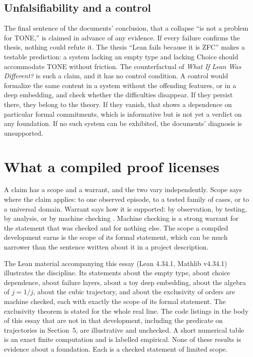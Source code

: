 \documentclass[11pt]{article}
\begin{document}
\subsection{Unfalsifiability and a control}

The final sentence of the documents' conclusion, that a collapse ``is not a problem for TONE,'' is claimed in advance of any evidence. If every failure confirms the thesis, nothing could refute it. The thesis ``Lean fails because it is ZFC'' makes a testable prediction: a system lacking an empty type and lacking Choice should accommodate TONE without friction. The counterfactual of \emph{What If Lean Was Different?} is such a claim, and it has no control condition. A control would formalize the same content in a system without the offending features, or in a deep embedding, and check whether the difficulties disappear. If they persist there, they belong to the theory. If they vanish, that shows a dependence on particular formal commitments, which is informative but is not yet a verdict on any foundation. If no such system can be exhibited, the documents' diagnosis is unsupported.

\section{What a compiled proof licenses}
\label{sec:licenses}

A claim has a scope and a warrant, and the two vary independently. Scope says where the claim applies: to one observed episode, to a tested family of cases, or to a universal domain. Warrant says how it is supported: by observation, by testing, by analysis, or by machine checking \cite{flyxion2026adv,flyxion2026deg}. Machine checking is a strong warrant for the statement that was checked and for nothing else. The scope a compiled development earns is the scope of its formal statement, which can be much narrower than the sentence written about it in a project description.

The Lean material accompanying this essay (Lean 4.34.1, Mathlib v4.34.1) illustrates the discipline. Its statements about the empty type, about choice dependence, about failure layers, about a toy deep embedding, about the algebra of $j=1/j$, about the cubic trajectory, and about the exclusivity of orders are machine checked, each with exactly the scope of its formal statement. The exclusivity theorem is stated for the whole real line. The code listings in the body of this essay that are not in that development, including the predicate on trajectories in Section~5, are illustrative and unchecked. A short numerical table is an exact finite computation and is labelled empirical. None of these results is evidence about a foundation. Each is a checked statement of limited scope.
\end{document}
